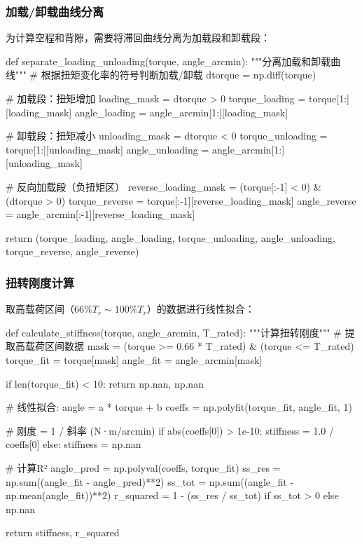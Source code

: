 \documentclass[12pt]{ctexart}
\begin{document}
\subsubsection{加载/卸载曲线分离}
为计算空程和背隙，需要将滞回曲线分离为加载段和卸载段：

\begin{pythoncode}[曲线分离算法]
def separate_loading_unloading(torque, angle_arcmin):
    """分离加载和卸载曲线"""
    # 根据扭矩变化率的符号判断加载/卸载
    dtorque = np.diff(torque)

    # 加载段：扭矩增加
    loading_mask = dtorque > 0
    torque_loading = torque[1:][loading_mask]
    angle_loading = angle_arcmin[1:][loading_mask]

    # 卸载段：扭矩减小
    unloading_mask = dtorque < 0
    torque_unloading = torque[1:][unloading_mask]
    angle_unloading = angle_arcmin[1:][unloading_mask]

    # 反向加载段（负扭矩区）
    reverse_loading_mask = (torque[:-1] < 0) & (dtorque > 0)
    torque_reverse = torque[:-1][reverse_loading_mask]
    angle_reverse = angle_arcmin[:-1][reverse_loading_mask]

    return (torque_loading, angle_loading,
            torque_unloading, angle_unloading,
            torque_reverse, angle_reverse)
\end{pythoncode}

\subsubsection{扭转刚度计算}
取高载荷区间（$66\% T_r \sim 100\% T_r$）的数据进行线性拟合：

\begin{pythoncode}[刚度计算算法]
def calculate_stiffness(torque, angle_arcmin, T_rated):
    """计算扭转刚度"""
    # 提取高载荷区间数据
    mask = (torque >= 0.66 * T_rated) & (torque <= T_rated)
    torque_fit = torque[mask]
    angle_fit = angle_arcmin[mask]

    if len(torque_fit) < 10:
        return np.nan, np.nan

    # 线性拟合: angle = a * torque + b
    coeffs = np.polyfit(torque_fit, angle_fit, 1)

    # 刚度 = 1 / 斜率 (N·m/arcmin)
    if abs(coeffs[0]) > 1e-10:
        stiffness = 1.0 / coeffs[0]
    else:
        stiffness = np.nan

    # 计算R²
    angle_pred = np.polyval(coeffs, torque_fit)
    ss_res = np.sum((angle_fit - angle_pred)**2)
    ss_tot = np.sum((angle_fit - np.mean(angle_fit))**2)
    r_squared = 1 - (ss_res / ss_tot) if ss_tot > 0 else np.nan

    return stiffness, r_squared
\end{pythoncode}
\end{document}
